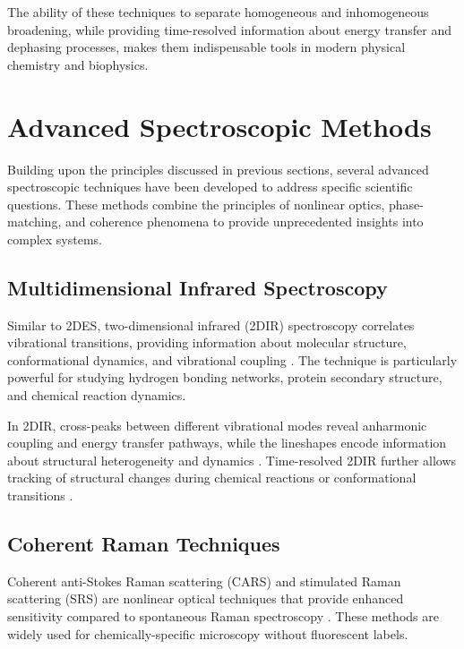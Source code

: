 \noindent The ability of these techniques to separate homogeneous and inhomogeneous broadening, while providing time-resolved information about energy transfer and dephasing processes, makes them indispensable tools in modern physical chemistry and biophysics.


\section{Advanced Spectroscopic Methods}
\label{sec:advanced_methods}

\noindent Building upon the principles discussed in previous sections, several advanced spectroscopic techniques have been developed to address specific scientific questions. These methods combine the principles of nonlinear optics, phase-matching, and coherence phenomena to provide unprecedented insights into complex systems.

\subsection{Multidimensional Infrared Spectroscopy}
\label{subsec:2dir}

\noindent Similar to 2DES, two-dimensional infrared (2DIR) spectroscopy correlates vibrational transitions, providing information about molecular structure, conformational dynamics, and vibrational coupling \cite{Hamm2011, Khalil2003}. The technique is particularly powerful for studying hydrogen bonding networks, protein secondary structure, and chemical reaction dynamics.

\noindent In 2DIR, cross-peaks between different vibrational modes reveal anharmonic coupling and energy transfer pathways, while the lineshapes encode information about structural heterogeneity and dynamics \cite{Khalil2003}. Time-resolved 2DIR further allows tracking of structural changes during chemical reactions or conformational transitions \cite{Fayer2009}.

\subsection{Coherent Raman Techniques}
\label{subsec:coherent_raman}

\noindent Coherent anti-Stokes Raman scattering (CARS) and stimulated Raman scattering (SRS) are nonlinear optical techniques that provide enhanced sensitivity compared to spontaneous Raman spectroscopy \cite{Boyd2008}. These methods are widely used for chemically-specific microscopy without fluorescent labels.

